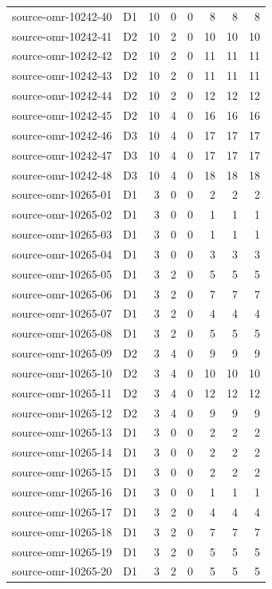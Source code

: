 \begin{longtable}{llrrrrrr}
source-omr-10242-40 & D1 & 10 & 0 & 0 & 8 & 8 & 8\\
source-omr-10242-41 & D2 & 10 & 2 & 0 & 10 & 10 & 10\\
source-omr-10242-42 & D2 & 10 & 2 & 0 & 11 & 11 & 11\\
source-omr-10242-43 & D2 & 10 & 2 & 0 & 11 & 11 & 11\\
source-omr-10242-44 & D2 & 10 & 2 & 0 & 12 & 12 & 12\\
source-omr-10242-45 & D2 & 10 & 4 & 0 & 16 & 16 & 16\\
source-omr-10242-46 & D3 & 10 & 4 & 0 & 17 & 17 & 17\\
source-omr-10242-47 & D3 & 10 & 4 & 0 & 17 & 17 & 17\\
source-omr-10242-48 & D3 & 10 & 4 & 0 & 18 & 18 & 18\\
source-omr-10265-01 & D1 & 3 & 0 & 0 & 2 & 2 & 2\\
source-omr-10265-02 & D1 & 3 & 0 & 0 & 1 & 1 & 1\\
source-omr-10265-03 & D1 & 3 & 0 & 0 & 1 & 1 & 1\\
source-omr-10265-04 & D1 & 3 & 0 & 0 & 3 & 3 & 3\\
source-omr-10265-05 & D1 & 3 & 2 & 0 & 5 & 5 & 5\\
source-omr-10265-06 & D1 & 3 & 2 & 0 & 7 & 7 & 7\\
source-omr-10265-07 & D1 & 3 & 2 & 0 & 4 & 4 & 4\\
source-omr-10265-08 & D1 & 3 & 2 & 0 & 5 & 5 & 5\\
source-omr-10265-09 & D2 & 3 & 4 & 0 & 9 & 9 & 9\\
source-omr-10265-10 & D2 & 3 & 4 & 0 & 10 & 10 & 10\\
source-omr-10265-11 & D2 & 3 & 4 & 0 & 12 & 12 & 12\\
source-omr-10265-12 & D2 & 3 & 4 & 0 & 9 & 9 & 9\\
source-omr-10265-13 & D1 & 3 & 0 & 0 & 2 & 2 & 2\\
source-omr-10265-14 & D1 & 3 & 0 & 0 & 2 & 2 & 2\\
source-omr-10265-15 & D1 & 3 & 0 & 0 & 2 & 2 & 2\\
source-omr-10265-16 & D1 & 3 & 0 & 0 & 1 & 1 & 1\\
source-omr-10265-17 & D1 & 3 & 2 & 0 & 4 & 4 & 4\\
source-omr-10265-18 & D1 & 3 & 2 & 0 & 7 & 7 & 7\\
source-omr-10265-19 & D1 & 3 & 2 & 0 & 5 & 5 & 5\\
source-omr-10265-20 & D1 & 3 & 2 & 0 & 5 & 5 & 5\\

\end{longtable}
